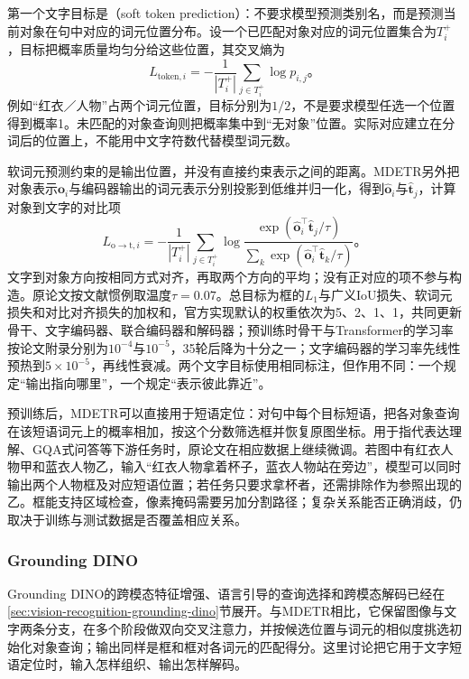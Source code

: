 第一个文字目标是（soft token prediction）：不要求模型预测类别名，而是预测当前对象在句中对应的词元位置分布。设一个已匹配对象对应的词元位置集合为$T_i^+$，目标把概率质量均匀分给这些位置，其交叉熵为
\begin{equation}
  L_{\mathrm{token},i}
  =-\frac{1}{|T_i^+|}\sum_{j\in T_i^+}\log p_{i,j}\text{。}
  \label{eq:vision-mdetr-token}
\end{equation}
例如“红衣／人物”占两个词元位置，目标分别为$1/2$，不是要求模型任选一个位置得到概率1。未匹配的对象查询则把概率集中到“无对象”位置。实际对应建立在分词后的位置上，不能用中文字符数代替模型词元数。

软词元预测约束的是输出位置，并没有直接约束表示之间的距离。MDETR另外把对象表示$\bm o_i$与编码器输出的词元表示分别投影到低维并归一化，得到$\hat{\bm o}_i$与$\hat{\bm t}_j$，计算对象到文字的对比项
\begin{equation}
  L_{\mathrm{o\to t},i}
  =-\frac{1}{|T_i^+|}\sum_{j\in T_i^+}
    \log\frac{\exp(\hat{\bm o}_i^\top\hat{\bm t}_j/\tau)}
    {\sum_k\exp(\hat{\bm o}_i^\top\hat{\bm t}_k/\tau)}\text{。}
  \label{eq:vision-mdetr-contrast}
\end{equation}
文字到对象方向按相同方式对齐，再取两个方向的平均；没有正对应的项不参与构造。原论文按文献惯例取温度$\tau=0.07$。总目标为框的$L_1$与广义IoU损失、软词元损失和对比对齐损失的加权和，官方实现默认的权重依次为5、2、1、1，共同更新骨干、文字编码器、联合编码器和解码器；预训练时骨干与Transformer的学习率按论文附录分别为$10^{-4}$与$10^{-5}$，35轮后降为十分之一；文字编码器的学习率先线性预热到$5\times10^{-5}$，再线性衰减。两个文字目标使用相同标注，但作用不同：一个规定“输出指向哪里”，一个规定“表示彼此靠近”。

预训练后，MDETR可以直接用于短语定位：对句中每个目标短语，把各对象查询在该短语词元上的概率相加，按这个分数筛选框并恢复原图坐标。用于指代表达理解、GQA式问答等下游任务时，原论文在相应数据上继续微调。若图中有红衣人物甲和蓝衣人物乙，输入“红衣人物拿着杯子，蓝衣人物站在旁边”，模型可以同时输出两个人物框及对应短语位置；若任务只要求拿杯者，还需排除作为参照出现的乙。框能支持区域检查，像素掩码需要另加分割路径；复杂关系能否正确消歧，仍取决于训练与测试数据是否覆盖相应关系。

\subsubsection{Grounding DINO}
\label{sec:vision-understanding-grounding-dino}

Grounding DINO的跨模态特征增强、语言引导的查询选择和跨模态解码已经在\ref{sec:vision-recognition-grounding-dino}节展开。与MDETR相比，它保留图像与文字两条分支，在多个阶段做双向交叉注意力，并按候选位置与词元的相似度挑选初始化对象查询；输出同样是框和框对各词元的匹配得分。这里讨论把它用于文字短语定位时，输入怎样组织、输出怎样解码。

